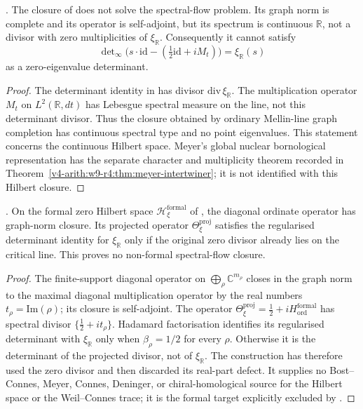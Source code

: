\begin{proposition}
\label{v4-arith:w9-r4:prop:classical-closure-insufficient}
\ClaimStatusProvedHere. The closure of
 does not solve
the spectral-flow problem. Its graph norm is complete and its
operator is self-adjoint, but its spectrum is continuous
\(\mathbb{R}\), not a divisor with zero multiplicities of
\(\xi_{\mathbb R}\).
Consequently it cannot satisfy
\[
\det\nolimits_{\infty}
\bigl(s\cdot\mathrm{id}-({\tfrac12}\mathrm{id}+iM_{t})\bigr)
=\xi_{\mathbb{R}}(s)
\]
as a zero-eigenvalue determinant.
\end{proposition}

\begin{proof}
The determinant identity in
 has divisor
\(\mathrm{div}\,\xi_{\mathbb R}\). The multiplication operator
\(M_{t}\) on \(L^{2}(\mathbb{R},dt)\) has Lebesgue spectral measure on
the line, not this determinant divisor. Thus the closure obtained by
ordinary Mellin-line graph completion has continuous spectral
type and no point eigenvalues. This statement concerns the continuous
Hilbert space. Meyer's global nuclear bornological representation
has the separate character and multiplicity theorem recorded in
Theorem~\ref{v4-arith:w9-r4:thm:meyer-intertwiner}; it is not
identified with this Hilbert closure.
\end{proof}

\begin{proposition}
\label{v4-arith:w9-r4:prop:formal-zero-closure-tautological}
\ClaimStatusProvedHere. On the formal zero Hilbert space
\(\mathcal{H}_{\xi}^{\mathrm{formal}}\) of
, the diagonal ordinate
operator has graph-norm closure. Its projected operator
\(\Theta_{\xi}^{\mathrm{proj}}\) satisfies the regularised
determinant identity for \(\xi_{\mathbb R}\) only if the original
zero divisor already lies on the critical line. This proves no
non-formal spectral-flow closure.
\end{proposition}

\begin{proof}
The finite-support diagonal operator on
\(\bigoplus_{\rho}\mathbb{C}^{m_{\rho}}\) closes in the graph norm to
the maximal diagonal multiplication operator by the real numbers
\(t_{\rho}=\mathrm{Im}(\rho)\); its closure is self-adjoint. The
operator \(\Theta_{\xi}^{\mathrm{proj}}=\tfrac12+iH_{\mathrm{ord}}^{\mathrm{formal}}\)
has spectral divisor
\(\{\tfrac12+it_{\rho}\}\). Hadamard factorisation identifies its
regularised determinant with \(\xi_{\mathbb R}\) only when
\(\beta_{\rho}=1/2\) for every \(\rho\). Otherwise it is the
determinant of the projected divisor, not of \(\xi_{\mathbb R}\).
The construction has therefore used the zero divisor and then
discarded its real-part defect. It supplies no Bost--Connes, Meyer,
Connes, Deninger, or chiral-homological source for the Hilbert space
or the Weil--Connes trace; it is the formal target explicitly excluded
by .
\end{proof}

